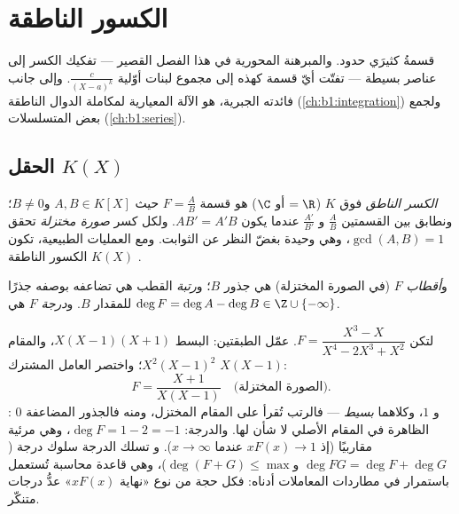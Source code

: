 \chapter{الكسور الناطقة}\label{ch:b1:fractions}

 قسمةُ كثيرَي حدود. والمبرهنة المحورية
في هذا الفصل القصير --- تفكيك الكسر إلى عناصر
بسيطة --- تفتّت أيّ
قسمة كهذه إلى مجموع لبنات أوّلية $\frac{c}{(X - a)^k}$.
وإلى جانب فائدته الجبرية، هو الآلة المعيارية
لمكاملة الدوال الناطقة (\cref{ch:b1:integration}) ولجمع
بعض المتسلسلات (\cref{ch:b1:series}).

\section{الحقل $K(X)$}

\begin{definition}\label{def:b1:fractions:field}
\emph{الكسر الناطق} فوق $K$ ($= \R$
أو $\C$) هو قسمة $F = \frac{A}{B}$ حيث $A, B \in K[X]$ و$B \neq
0$؛ ونطابق بين القسمتين $\frac AB$ و $\frac{A'}{B'}$ عندما يكون
$AB' = A'B$. ولكل كسر \emph{صورة مختزلة} تحقق
$\gcd(A, B) = 1$، وهي وحيدة بغضّ النظر عن الثوابت. ومع العمليات الطبيعية،
تكون  الكسور الناطقة $K(X)$ .

و\emph{أقطاب} $F$ (في الصورة المختزلة) هي جذور
$B$؛ و\emph{رتبة} القطب هي تضاعفه بوصفه جذرًا للمقدار $B$.
و\emph{درجة} $F$ هي $\deg F = \deg A - \deg B \in \Z \cup
\{-\infty\}$.
\end{definition}

\begin{example}\label{ex:b1:fractions:vocab}
لتكن $F = \dfrac{X^3 - X}{X^4 - 2X^3 + X^2}$. عمّل الطبقتين:
البسط $X(X-1)(X+1)$، والمقام $X^2(X-1)^2$؛ واختصر
العامل المشترك $X(X-1)$:
\[
F = \frac{X + 1}{X(X - 1)} \quad\text{(الصورة المختزلة).}
\]
: $0$ و $1$، وكلاهما \emph{بسيط} --- فالرتب تُقرأ على
المقام المختزل، ومنه فالجذور المضاعفة الظاهرة في المقام
الأصلي لا شأن لها. والدرجة: $\deg F = 1 - 2 = -1$،
وهي مرئية مقاربيًا (إذ $xF(x) \to 1$ عندما $x \to \infty$). و
تسلك الدرجة سلوك درجة  ($\deg FG = \deg F +
\deg G$ و$\deg(F + G) \leq \max$)، وهي قاعدة محاسبة تُستعمل
باستمرار في مطاردات المعاملات أدناه: فكل حجة من نوع «نهاية
$xF(x)$» عدُّ درجات متنكّر.
\end{example}

